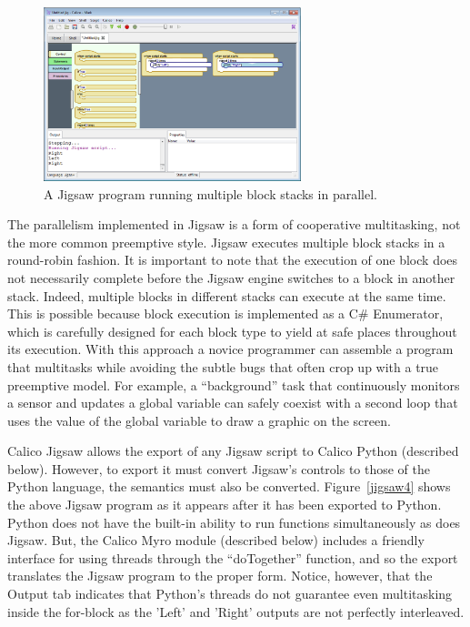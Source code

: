 \documentclass[preprint]{sigplanconf}
\begin{document}
\begin{figure}[h!]
  \centering
    \includegraphics[width=75mm]{jigsaw3.eps} 
  \caption{A Jigsaw program running multiple block stacks in parallel.}
  \label{jigsaw3}
\end{figure}

The parallelism implemented in Jigsaw is a form of
cooperative multitasking, not the more common preemptive style. Jigsaw
executes multiple block stacks in a round-robin fashion. It is
important to note that the execution of one block does not necessarily
complete before the Jigsaw engine switches to a block in another
stack. Indeed, multiple blocks in different stacks can execute at the
same time. This is possible because block execution is implemented 
as a C\# Enumerator, which is carefully designed for each block type
to yield at safe places throughout its execution. With this
approach a novice programmer can assemble a program that
multitasks while avoiding the subtle bugs that often crop 
up with a true preemptive model. For example, a ``background'' task
that continuously monitors a sensor and updates a global variable 
can safely coexist with a second loop that uses the value of the global
variable to draw a graphic on the screen.

Calico Jigsaw allows the export of any Jigsaw script to Calico Python
(described below). However, to export it must convert Jigsaw's
controls to those of the Python language, the semantics must also be
converted. Figure~\ref{jigsaw4} shows the above Jigsaw program as it
appears after it has been exported to Python. Python does not have the
built-in ability to run functions simultaneously as does Jigsaw. But,
the Calico Myro module (described below) includes a friendly interface
for using threads through the ``doTogether'' function, and so the
export translates the Jigsaw program to the proper form. Notice,
however, that the Output tab indicates that Python's threads do not
guarantee even multitasking inside the for-block as the 'Left' and
'Right' outputs are not perfectly interleaved.
\end{document}
